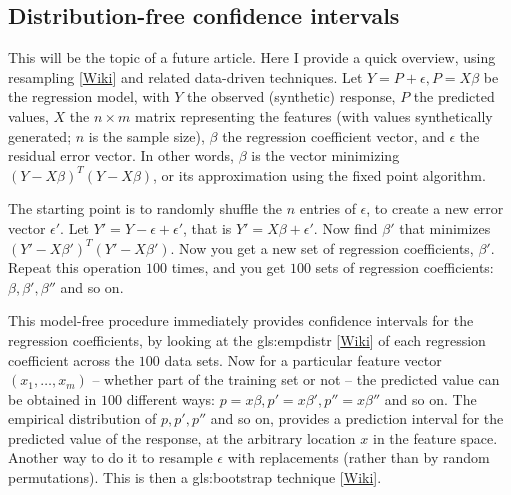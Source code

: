 \documentclass[oneside,10pt]{book}
\begin{document}
\subsection{Distribution-free confidence intervals}\label{rdfci}

This will be the topic of a future article. Here I provide a quick overview, using \textcolor{index}{resampling} [\href{https://en.wikipedia.org/wiki/Resampling_(statistics)}{Wiki}] and related data-driven techniques. Let $Y=P+\epsilon, P=X\beta$ be the regression model, with $Y$ the observed (synthetic) response, $P$ the predicted values, $X$ the $n\times m$ matrix
representing the features (with values synthetically generated; $n$ is the sample size), $\beta$ the regression coefficient vector, and $\epsilon$ the residual error vector. In other words, $\beta$ is the vector minimizing $(Y-X\beta)^T(Y-X\beta)$, or its approximation using the fixed point algorithm.

The starting point is to randomly shuffle the $n$ entries of $\epsilon$, to create a new error vector $\epsilon'$. Let $Y'=Y-\epsilon+\epsilon'$, that is  $Y'=X\beta+\epsilon'$. Now find $\beta'$ that minimizes 
$(Y'-X\beta')^T(Y'-X\beta')$. Now you get a new set of regression coefficients, $\beta'$. Repeat this operation $100$ times, and you get $100$ sets of regression coefficients: $\beta, \beta', \beta''$ and so on. 

This model-free procedure immediately provides confidence intervals for the regression coefficients, by looking at the 
\gls{gls:empdistr}
 [\href{https://en.wikipedia.org/wiki/Empirical_distribution_function}{Wiki}] of each regression coefficient across the $100$ data sets. Now for a particular feature vector $(x_1,\dots,x_m)$ -- whether part of the training set or not -- the predicted value can be obtained in $100$ different ways: $p=x\beta, p'=x\beta', p''=x\beta''$ and so on. The empirical distribution of $p,p',p''$ and so on, provides a \textcolor{index}{prediction interval} for the predicted value of the response, at the arbitrary location $x$ in the feature space. Another way to do it to resample $\epsilon$ with replacements (rather than by random permutations). This is then a \gls{gls:bootstrap} technique [\href{https://en.wikipedia.org/wiki/Bootstrapping_(statistics)}{Wiki}].
\end{document}
